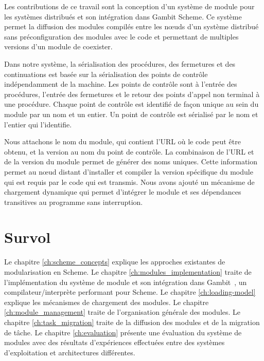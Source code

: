 Les contributions de ce travail sont la conception d'un système de module pour
les systèmes distribués et son intégration dans Gambit Scheme. Ce système
permet la diffusion des modules compilés entre les nœuds d'un système
distribué sans préconfiguration des modules avec le code et permettant
de multiples versions d'un module de coexister.

Dans notre système, la sérialisation des procédures, des fermetures et des
continuations est basée sur la sérialisation des points de contrôle
indépendamment de la machine. Les points de contrôle sont à l'entrée des
procédures, l'entrée des fermetures et le retour des points d'appel non
terminal à une procédure.  Chaque point de contrôle est identifié de façon
unique au sein du module par un nom et un entier. Un point de contrôle est
sérialisé par le nom et l'entier qui l'identifie.

Nous attachons le nom du module, qui contient l'URL où le code peut être
obtenu, et la version au nom du point de contrôle. La combinaison de l'URL et
de la version du module permet de générer des noms uniques. Cette information
permet au nœud distant d'installer et compiler la version spécifique du module
qui est requis par le code qui est transmis.  Nous avons ajouté un mécanisme de
chargement dynamique qui permet d'intégrer le module et ses dépendances
transitives au programme sans interruption.


\section{Survol}

Le chapitre \ref{ch:scheme_concepts} explique les approches existantes de
modularisation en Scheme.  Le chapitre \ref{ch:modules_implementation}
traite de l'implémentation du système de module et son intégration dans Gambit~\cite{gambitdoc},
un compilateur/interprète performant pour Scheme. Le chapitre
\ref{ch:loading-model} explique les mécanismes de chargement des modules.  Le
chapitre \ref{ch:module_management} traite de l'organisation générale des
modules. Le chapitre \ref{ch:task_migration} traite de la diffusion des modules
et de la migration de tâche.  Le chapitre \ref{ch:evaluation} présente une
évaluation du système de modules avec des résultats d'expériences effectuées
entre des systèmes d'exploitation et architectures différentes.


